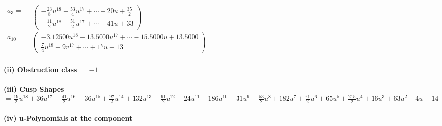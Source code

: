 \documentclass[1p]{elsarticle_modified}
\theoremstyle{definition}
\begin{document}
\begin{tabular}{m{7pt} m{180pt} m{7pt} m{180pt} }
\flushright $a_{3}=$&$\begin{pmatrix}-\frac{23}{8} u^{18}-\frac{53}{4} u^{17}+\cdots-20 u+\frac{35}{2}\\-\frac{11}{2} u^{18}-\frac{51}{2} u^{17}+\cdots-41 u+33\end{pmatrix}$ \\
\flushright $a_{10}=$&$\begin{pmatrix}-3.12500 u^{18}-13.5000 u^{17}+\cdots-15.5000 u+13.5000\\\frac{7}{4} u^{18}+9 u^{17}+\cdots+17 u-13\end{pmatrix}$\\&\end{tabular}
\flushleft \textbf{(ii) Obstruction class $= -1$}\\~\\
\flushleft \textbf{(iii) Cusp Shapes $= \frac{19}{2} u^{18}+36 u^{17}+\frac{41}{2} u^{16}-36 u^{15}+\frac{97}{2} u^{14}+132 u^{13}-\frac{91}{2} u^{12}-24 u^{11}+186 u^{10}+31 u^9+\frac{53}{2} u^8+182 u^7+\frac{61}{2} u^6+65 u^5+\frac{215}{2} u^4+16 u^3+63 u^2+4 u-14$}\\~\\
\newpage\renewcommand{\arraystretch}{1}
\flushleft \textbf{(iv) u-Polynomials at the component}\newline \\
\end{document}
